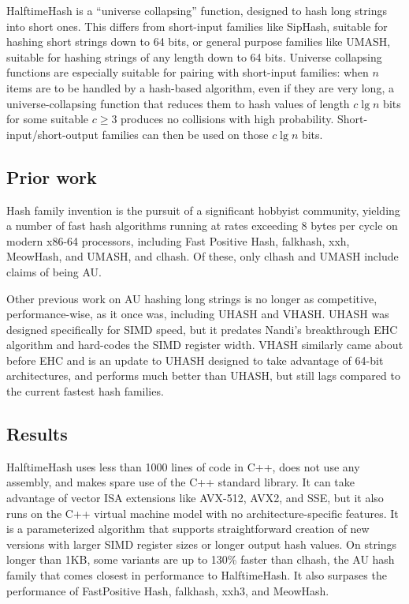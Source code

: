 \documentclass[sigconf, nonacm]{acmart}
\begin{document}
HalftimeHash is a ``universe collapsing'' function, designed to hash long strings into short ones. \cite{linear-hash-functions,hashing-without-primes-revisited,cuckoo-journal}
This differs from short-input families like SipHash, suitable for hashing short strings down to 64 bits, or general purpose families like UMASH, suitable for hashing strings of any length down to 64 bits.
Universe collapsing functions are especially suitable for pairing with short-input families: when $n$ items are to be handled by a hash-based algorithm, even if they are very long, a universe-collapsing function that reduces them to hash values of length $c \lg n$ bits for some suitable $c \geq 3$ produces no collisions with high probability.
Short-input/short-output families can then be used on those $c \lg n$ bits. \cite{universe-collapse-linear-probing,siphash,tabulation,simple-hash-functions-work}

\subsection{Prior work}

Hash family invention is the pursuit of a significant hobbyist community, yielding a number of fast hash algorithms running at rates exceeding 8 bytes per cycle on modern x86-64 processors, including Fast Positive Hash, falk\-hash, xxh, Meow\-Hash, and UMASH, and cl\-hash. \cite{smhasher}
Of these, only cl\-hash and U\-MASH include claims of being AU.

Other previous work on AU hashing long strings is no longer as competitive, performance-wise, as it once was, including UHASH and VHASH.
UHASH was designed specifically for SIMD speed, but it predates Nandi's breakthrough EHC algorithm and hard-codes the SIMD register width. \cite{umac}
VHASH similarly came about before EHC and is an update to UHASH designed to take advantage of 64-bit architectures, and performs much better than UHASH, but still lags compared to the current fastest hash families. \cite{vmac,smhasher}

\subsection{Results}

HalftimeHash uses less than 1000 lines of code in C++, does not use any assembly, and makes spare use of the C++ standard library.
It can take advantage of vector ISA extensions like AVX-512, AVX2, and SSE, but it also runs on the C++ virtual machine model with no architecture-specific features.
It is a parameterized algorithm that supports straightforward creation of new versions with larger SIMD register sizes or longer output hash values.
On strings longer than 1KB, some variants are up to 130\% faster than clhash, the AU hash family that comes closest in performance to HalftimeHash.
It also surpases the performance of FastPositive Hash, falkhash, xxh3, and MeowHash.
\end{document}
